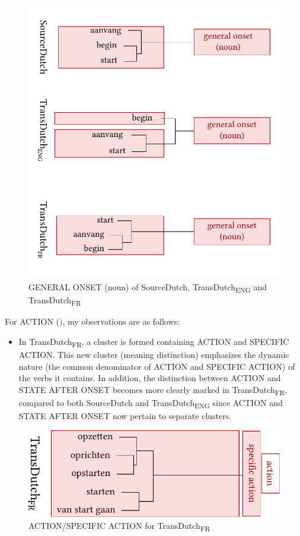 \begin{figure}
\includegraphics[width=\textwidth]{figures/tree88.pdf}
\caption{\label{fig:4:85}  GENERAL ONSET (noun) of SourceDutch, TransDutch\textsubscript{ENG} and TransDutch\textsubscript{FR}}
\end{figure}

For ACTION (), my observations are as follows:

\begin{itemize}
\item  In TransDutch\textsubscript{FR}, a cluster is formed containing ACTION and {SPECIFIC} ACTION. This new cluster (meaning distinction) emphasizes the dynamic nature (the common denominator of ACTION and {SPECIFIC} ACTION) of the verbs it contains. In addition, the distinction between ACTION and STATE AFTER ONSET becomes more clearly marked in TransDutch\textsubscript{FR}, compared to both SourceDutch and TransDutch\textsubscript{ENG} since ACTION and STATE AFTER ONSET now pertain to separate clusters.
\end{itemize}

\begin{figure}
\includegraphics[width=.66\textwidth]{figures/tree89.pdf}
\caption{\label{fig:4:86}  ACTION/SPECIFIC ACTION for TransDutch\textsubscript{FR}}
\end{figure}

